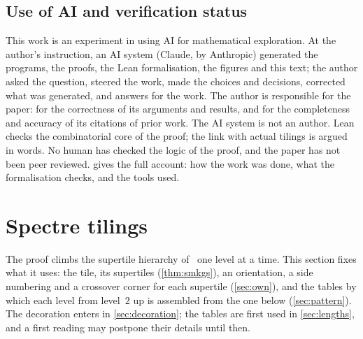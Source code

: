 \documentclass[11pt]{amsart}
\theoremstyle{definition}
\theoremstyle{remark}
\begin{document}
\subsection*{Use of AI and verification status}
This work is an experiment in using AI for mathematical exploration. At the author's instruction, an AI system
(Claude, by Anthropic) generated the programs, the proofs, the Lean formalisation, the figures and this text; the
author asked the question, steered the work, made the choices and decisions, corrected what was generated, and answers
for the work.
The author is responsible for the paper: for the correctness of its arguments and results, and for the completeness and
accuracy of its citations of prior work. The AI system is not an author. Lean checks the combinatorial core of the
proof; the link with actual tilings is argued in words. No human has checked the logic of the proof, and the
paper has not been peer reviewed.  gives the full account: how the work was done, what the formalisation
checks, and the tools used.

\section{Spectre tilings}\label{sec:spectre}
\suppressfloats[t]

The proof climbs the supertile hierarchy of~\cite{SMKGS-spectre} one level at a time. This section fixes what it uses:
the tile, its supertiles (\cref{thm:smkgs}), an orientation, a side numbering and a crossover corner for each supertile
(\cref{sec:own}), and the tables by which each level from level~$2$ up is assembled from the one below
(\cref{sec:pattern}). The decoration enters in \cref{sec:decoration}; the tables are first used in \cref{sec:lengths},
and a first reading may postpone their details until then.
\end{document}
